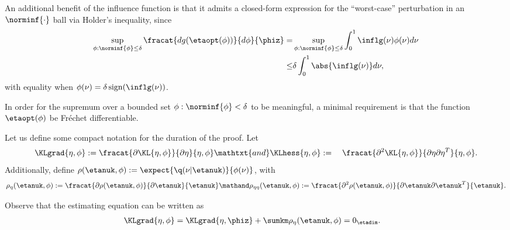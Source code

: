 An additional benefit of the influence function is that it admits a closed-form
expression for the ``worst-case'' perturbation in an $\norminf{\cdot}$ ball
via Holder's inequality, since
%
\begin{align*}
%
\sup_{\phi: \norminf{\phi} \le \delta}
    \fracat{d g(\etaopt(\phi))}{d \phi}{\phiz} =&{}
\sup_{\phi: \norminf{\phi} \le \delta}
    \int_0^1 \inflg(\nu) \phi(\nu) d\nu \\
\le&{} \delta \int_0^1 \abs{\inflg(\nu) }d\nu,
%
\end{align*}
%
with equality when $\phi(\nu) = \delta \, \mathrm{sign}(\inflg(\nu))$.

In order for the supremum over a bounded set $\phi: \norminf{\phi} < \delta$
to be meaningful, a minimal requirement is that the function $\etaopt(\phi)$
be Fr{\'e}chet differentiable.





















Let us define some compact notation for the duration of the proof.
Let
%
\begin{align*}
%
\KLgrad{\eta, \phi} :={}&
    \fracat{\partial \KL{\eta, \phi}}{\partial \eta}{\eta, \phi}
\mathtxt{and}
\KLhess{\eta, \phi} :={}&
    \fracat{\partial^2 \KL{\eta, \phi}}
           {\partial \eta \partial \eta^T}{\eta, \phi}.
%
\end{align*}
%
Additionally, define $\rho(\etanuk, \phi) :={} \expect{\q(\nu \vert
\etanuk)}{\phi(\nu)}$, with
%
\begin{align*}
%
\rho_\eta(\etanuk, \phi) :={}
\fracat{\partial \rho(\etanuk, \phi)}
       {\partial \etanuk}{\etanuk} \mathand
\rho_{\eta\eta}(\etanuk, \phi) :={}
   \fracat{\partial^2 \rho(\etanuk, \phi)}
          {\partial \etanuk \partial \etanuk^T}{\etanuk}.
%
\end{align*}

Observe that the estimating equation can be written as
%
\begin{align*}
%
%
\KLgrad{\eta, \phi} ={}&
\KLgrad{\eta, \phiz} + \sumkm \rho_\eta(\etanuk, \phi)
= 0_\etadim.
%
\end{align*}


